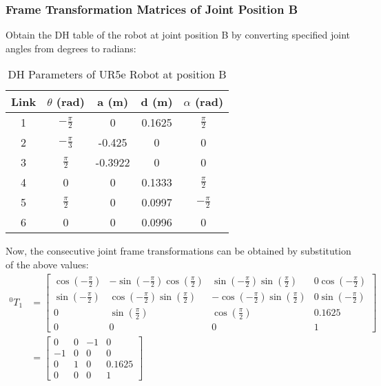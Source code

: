 \documentclass[fleqn]{article}
\begin{document}
\subsubsection{Frame Transformation Matrices of Joint Position B}
Obtain the DH table of the robot at joint position B by converting specified joint angles from degrees to radians:
\begin{table}[!ht]
    \caption{DH Parameters of UR5e Robot at position B}
    \begin{center}
    \begin{tabular}{||c | c | c | c | c||} 
     \hline
     Link & $\theta$ (rad) & a (m) & d (m) & $\alpha$ (rad)\\
     \hline\hline
     1 & $-\frac{\pi}{2}$ & 0 & 0.1625 & $\frac{\pi}{2}$ \\ [1ex] 
     \hline
     2 & $-\frac{\pi}{3}$ & -0.425 & 0 & 0 \\ [1ex] 
     \hline
     3 & $\frac{\pi}{2}$ & -0.3922 & 0 & 0 \\ [1ex] 
     \hline
     4 & 0 & 0 & 0.1333 & $\frac{\pi}{2}$ \\ [1ex] 
     \hline
     5 & $\frac{\pi}{2}$ & 0 & 0.0997 & $-\frac{\pi}{2}$ \\ [1ex] 
     \hline
     6 & 0 & 0 & 0.0996 & 0 \\ [1ex] 
     \hline
    \end{tabular}
    \end{center}
\end{table}

Now, the consecutive joint frame transformations can be obtained by substitution of the above values: 
\begin{equation}
\begin{split}
^{0}T_{1}&=\begin{bmatrix}
\cos(-\frac{\pi}{2}) & -\sin(-\frac{\pi}{2})\cos(\frac{\pi}{2}) & \sin(-\frac{\pi}{2})\sin(\frac{\pi}{2}) & 0\cos(-\frac{\pi}{2})\\
\sin(-\frac{\pi}{2}) & \cos(-\frac{\pi}{2})\sin(\frac{\pi}{2}) & -\cos(-\frac{\pi}{2})\sin(\frac{\pi}{2}) & 0\sin(-\frac{\pi}{2})\\
0 & \sin(\frac{\pi}{2}) & \cos(\frac{\pi}{2}) & 0.1625\\
0 & 0 & 0 & 1
\end{bmatrix}\\
&=\begin{bmatrix}
0 & 0 & -1 & 0\\
-1 & 0 & 0 & 0\\
0 & 1 & 0 & 0.1625\\
0 & 0 & 0 & 1
\end{bmatrix}
\end{split}
\end{equation}
\end{document}
